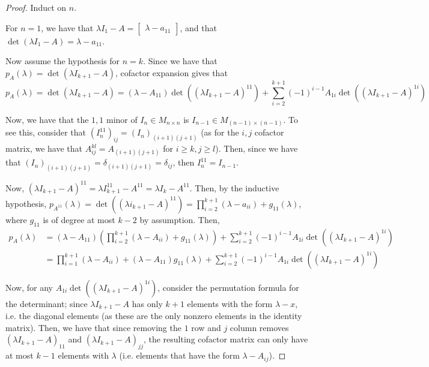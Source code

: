 \documentclass[12pt,letterpaper]{article}
\theoremstyle{definition}
\begin{document}
\begin{proof}
  Induct on $n$.

  For $n = 1$, we have that $\lambda I_1 - A = \begin{bmatrix} \lambda -
    a_{11} \end{bmatrix}$, and that $\det(\lambda I_1 - A) = \lambda - a_{11}$. 

  Now assume the hypothesis for $n = k$.
  Since we have that $p_A(\lambda) = \det(\lambda I_{k+1} - A)$, cofactor expansion
  gives that
  \[
    p_A(\lambda) = \det(\lambda I_{k+1} - A) = (\lambda - A_{11})\det((\lambda I_{k+1} -
    A)^{11}) + \sum_{i=2}^{k+1}(-1)^{i-1}A_{1i}\det((\lambda I_{k+1} - A)^{1i})
  \]

  
  Now, we have that the $1,1$ minor of $I_n \in M_{n \times n}$ is $I_{n-1} \in
  M_{(n-1)\times(n-1)}$. To see this, consider that $(I^{11}_n)_{ij} =
  (I_n)_{(i+1)(j+1)}$ (as for the $i, j$ cofactor matrix, we have that
  $A^{kl}_{ij} = A_{(i+1)(j+1)}$ for $i \geq k, j \geq l$). Then, since we have
  that $(I_n)_{(i+1)(j+1)} = \delta_{(i+1)(j+1)} = \delta_{ij}$, then $I^{11}_n = I_{n-1}$.


  Now, $(\lambda I_{k+1} - A)^{11} = \lambda I_{k+1}^{11} - A^{11} =
  \lambda I_{k} - A^{11}$. Then, by the inductive hypothesis,
  $p_{A^{11}}(\lambda) = \det((\lambda i_{k+1} - A)^{11}) = 
  \prod_{i=2}^{k+1}(\lambda - a_{ii}) + g_{11}(\lambda)$, where
  $g_{11}$ is of degree at most $k - 2$ by assumption. Then,
  \begin{align*}
    p_A(\lambda) &= (\lambda - A_{11})(\prod_{i=2}^{k+1}(\lambda - A_{ii}) +
    g_{11}(\lambda)) + \sum_{i=2}^{k+1}(-1)^{i-1}A_{1i}\det((\lambda I_{k+1} -
                   A)^{1i}) \\
                 &= \prod_{i=1}^{k+1}(\lambda - A_{ii}) +
                   (\lambda - A_{11})g_{11}(\lambda) + \sum_{i=2}^{k+1}(-1)^{i-1}A_{1i}\det((\lambda I_{k+1} -
                   A)^{1i})
  \end{align*}

  Now, for any $A_{1i}\det((\lambda I_{k+1} - A)^{1i})$, consider the permutation
  formula for the determinant; since $\lambda I_{k+1} - A$ has only $k+1$
  elements with the form $\lambda - x$, i.e. the diagonal elements (as these are the only
  nonzero elements in the identity matrix). Then, we have that since removing
  the $1$ row and $j$ column removes $(\lambda I_{k+1} - A)_{11}$ and $(\lambda
  I_{k+1} - A)_{jj}$, the resulting cofactor matrix can only have at most $k -
  1$ elements with $\lambda$ (i.e. elements that have the form $\lambda - A_{ij}$).


\end{proof}
\end{document}
